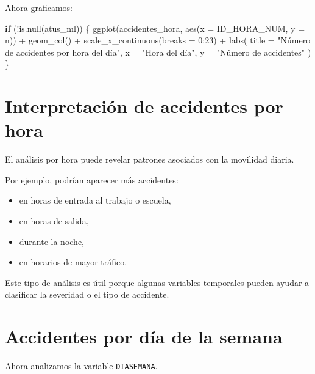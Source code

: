 \documentclass[
  11pt,
  letterpaper,
]{book}
\newenvironment{Shaded}{\begin{snugshade}}{\end{snugshade}}
\newcommand{\AttributeTok}[1]{\textcolor[rgb]{0.40,0.45,0.13}{#1}}
\newcommand{\ControlFlowTok}[1]{\textcolor[rgb]{0.00,0.23,0.31}{\textbf{#1}}}
\newcommand{\DecValTok}[1]{\textcolor[rgb]{0.68,0.00,0.00}{#1}}
\newcommand{\FunctionTok}[1]{\textcolor[rgb]{0.28,0.35,0.67}{#1}}
\newcommand{\NormalTok}[1]{\textcolor[rgb]{0.00,0.23,0.31}{#1}}
\newcommand{\SpecialCharTok}[1]{\textcolor[rgb]{0.37,0.37,0.37}{#1}}
\newcommand{\StringTok}[1]{\textcolor[rgb]{0.13,0.47,0.30}{#1}}
\providecommand{\tightlist}{%
  \setlength{\itemsep}{0pt}\setlength{\parskip}{0pt}}
\begin{document}
Ahora graficamos:

\begin{Shaded}
\begin{Highlighting}[]
\ControlFlowTok{if}\NormalTok{ (}\SpecialCharTok{!}\FunctionTok{is.null}\NormalTok{(atus\_ml)) \{}
  \FunctionTok{ggplot}\NormalTok{(accidentes\_hora, }\FunctionTok{aes}\NormalTok{(}\AttributeTok{x =}\NormalTok{ ID\_HORA\_NUM, }\AttributeTok{y =}\NormalTok{ n)) }\SpecialCharTok{+}
    \FunctionTok{geom\_col}\NormalTok{() }\SpecialCharTok{+}
    \FunctionTok{scale\_x\_continuous}\NormalTok{(}\AttributeTok{breaks =} \DecValTok{0}\SpecialCharTok{:}\DecValTok{23}\NormalTok{) }\SpecialCharTok{+}
    \FunctionTok{labs}\NormalTok{(}
      \AttributeTok{title =} \StringTok{"Número de accidentes por hora del día"}\NormalTok{,}
      \AttributeTok{x =} \StringTok{"Hora del día"}\NormalTok{,}
      \AttributeTok{y =} \StringTok{"Número de accidentes"}
\NormalTok{    )}
\NormalTok{\}}
\end{Highlighting}
\end{Shaded}

\section{Interpretación de accidentes por
hora}\label{interpretaciuxf3n-de-accidentes-por-hora}

El análisis por hora puede revelar patrones asociados con la movilidad
diaria.

Por ejemplo, podrían aparecer más accidentes:

\begin{itemize}
\tightlist
\item
  en horas de entrada al trabajo o escuela,
\item
  en horas de salida,
\item
  durante la noche,
\item
  en horarios de mayor tráfico.
\end{itemize}

Este tipo de análisis es útil porque algunas variables temporales pueden
ayudar a clasificar la severidad o el tipo de accidente.

\section{Accidentes por día de la
semana}\label{accidentes-por-duxeda-de-la-semana}

Ahora analizamos la variable \texttt{DIASEMANA}.
\end{document}
